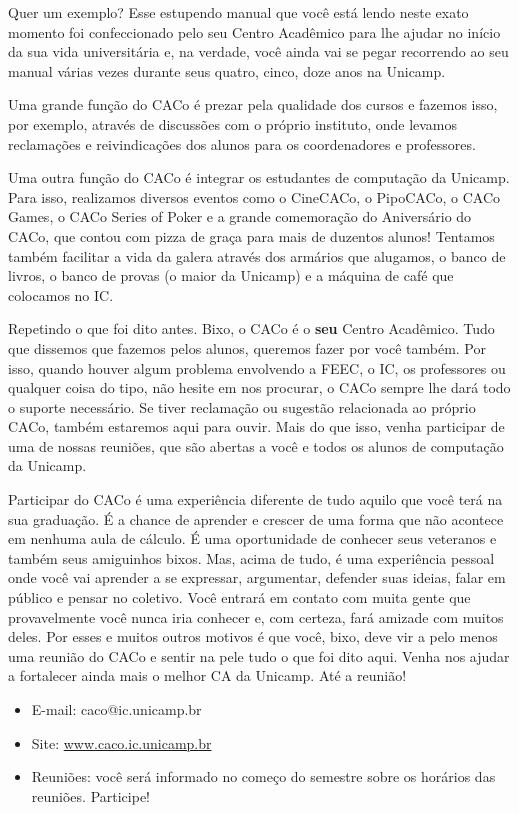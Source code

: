 Quer um exemplo? Esse estupendo manual que você está lendo neste exato momento
foi confeccionado pelo seu Centro Acadêmico para lhe ajudar no início da sua
vida universitária e, na verdade, você ainda vai se pegar recorrendo ao seu
manual várias vezes durante seus quatro, cinco, doze anos na Unicamp.

Uma grande função do CACo é prezar pela qualidade dos cursos e fazemos isso, por
exemplo, através de discussões com o próprio instituto, onde levamos reclamações
e reivindicações dos alunos para os coordenadores e professores.

Uma outra função do CACo é integrar os estudantes de computação da Unicamp. Para
isso, realizamos diversos eventos como o CineCACo, o PipoCACo, o CACo Games, o
CACo Series of Poker e a grande comemoração do Aniversário do CACo, que contou
com pizza de graça para mais de duzentos alunos! Tentamos também facilitar a
vida da galera através dos armários que alugamos, o banco de livros, o banco de
provas (o maior da Unicamp) e a máquina de café que colocamos no IC.

Repetindo o que foi dito antes. Bixo, o CACo é o \textbf{seu} Centro Acadêmico.
Tudo que dissemos que fazemos pelos alunos, queremos fazer por você também. Por
isso, quando houver algum problema envolvendo a FEEC, o IC, os professores ou
qualquer coisa do tipo, não hesite em nos procurar, o CACo sempre lhe dará todo
o suporte necessário. Se tiver reclamação ou sugestão relacionada ao próprio
CACo, também estaremos aqui para ouvir. Mais do que isso, venha participar de
uma de nossas reuniões, que são abertas a você e todos os alunos de computação
da Unicamp.

Participar do CACo é uma experiência diferente de tudo aquilo que você terá na
sua graduação. É a chance de aprender e crescer de uma forma que não acontece em
nenhuma aula de cálculo. É uma oportunidade de conhecer seus veteranos e também
seus amiguinhos bixos. Mas, acima de tudo, é uma experiência pessoal onde você
vai aprender a se expressar, argumentar, defender suas ideias, falar em público
e pensar no coletivo. Você entrará em contato com muita gente que provavelmente
você nunca iria conhecer e, com certeza, fará amizade com muitos deles. Por
esses e muitos outros motivos é que você, bixo, deve vir a pelo menos uma
reunião do CACo e sentir na pele tudo o que foi dito aqui. Venha nos ajudar a
fortalecer ainda mais o melhor CA da Unicamp. Até a reunião!

\begin{itemize}
\item  E-mail: caco@ic.unicamp.br
\item  Site: \url{www.caco.ic.unicamp.br}
\item  Reuniões: você será informado no começo do semestre sobre os horários das reuniões. Participe!
\end{itemize}

